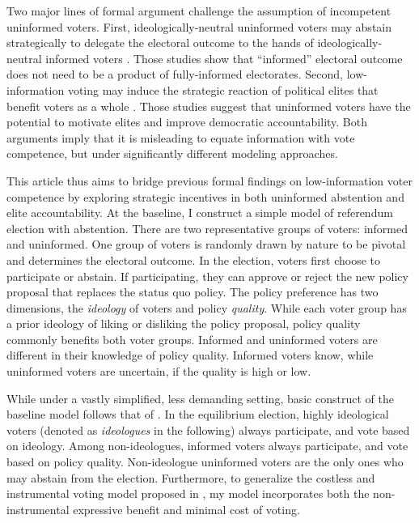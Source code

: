 \documentclass[letterpaper, 12pt]{article}
\begin{document}
    \par Two major lines of formal argument challenge the assumption of incompetent uninformed voters. First, ideologically-neutral uninformed voters may abstain strategically to delegate the electoral outcome to the hands of ideologically-neutral informed voters \citep{Feddersen1996thsw,Feddersen1999abin}. Those studies show that ``informed'' electoral outcome does not need to be a product of fully-informed electorates. Second, low-information voting may induce the strategic reaction of political elites that benefit voters as a whole \citep{Ashworth2014isvo, Prato2016thvo}. Those studies suggest that uninformed voters have the potential to motivate elites and improve democratic accountability. Both arguments imply that it is misleading to equate information with vote competence, but under significantly different modeling approaches.
    
    \par This article thus aims to bridge previous formal findings on low-information voter competence by exploring strategic incentives in both uninformed abstention and elite accountability. At the baseline, I construct a simple model of referendum election with abstention. There are two representative groups of voters: informed and uninformed. One group of voters is randomly drawn by nature to be pivotal and determines the electoral outcome. In the election, voters first choose to participate or abstain. If participating, they can approve or reject the new policy proposal that replaces the status quo policy. The policy preference has two dimensions, the \textit{ideology} of voters and policy \textit{quality}. While each voter group has a prior ideology of liking or disliking the policy proposal, policy quality commonly benefits both voter groups. Informed and uninformed voters are different in their knowledge of policy quality. Informed voters know, while uninformed voters are uncertain, if the quality is high or low.
    
    \par While under a vastly simplified, less demanding setting, basic construct of the baseline model follows that of \cite{Feddersen1996thsw}. In the equilibrium election, highly ideological voters (denoted as \textit{ideologues} in the following) always participate, and vote based on ideology. Among non-ideologues, informed voters always participate, and vote based on policy quality. Non-ideologue uninformed voters are the only ones who may abstain from the election. Furthermore, to generalize the costless and instrumental voting model proposed in \cite{Feddersen1996thsw,Feddersen1999abin}, my model incorporates both the non-instrumental expressive benefit and minimal cost of voting. 
\end{document}

